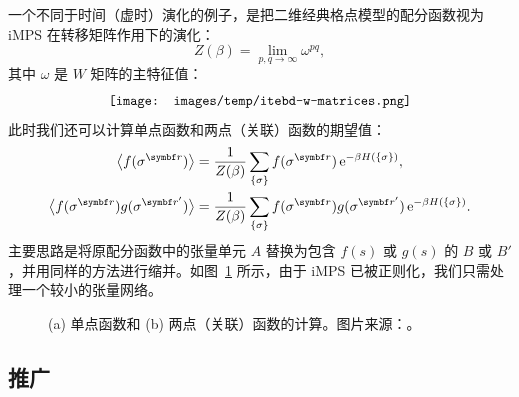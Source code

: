 一个不同于时间（虚时）演化的例子，是把二维经典格点模型的配分函数视为 iMPS 在转移矩阵作用下的演化：
\begin{equation}
  Z(\beta) = \lim_{p,q\to\infty} \omega^{pq},
\end{equation}
其中 $\omega$ 是 $W$ 矩阵的主特征值\cite{orus2008infinite}：
\begin{equation}
  \vcenter{\hbox{\texttt{[image: images/temp/itebd-w-matrices.png]}}}
\end{equation}
此时我们还可以计算单点函数和两点（关联）函数的期望值：
\begin{equation}
  \begin{aligned}
    \ev[\big]{f(\sigma^{\bm{r}})}
      &= \frac{1}{Z(\beta)} \sum_{\{\sigma\}} f(\sigma^{\bm{r}}) \, \ee^{-\beta H(\{\sigma\})}, \\
    \ev[\big]{f(\sigma^{\bm{r}}) g(\sigma^{\bm{r}'})}
      &= \frac{1}{Z(\beta)} \sum_{\{\sigma\}} f(\sigma^{\bm{r}}) g(\sigma^{\bm{r}'}) \, \ee^{-\beta H(\{\sigma\})}.
  \end{aligned}
\end{equation}
主要思路是将原配分函数中的张量单元 $A$ 替换为包含 $f(s)$ 或 $g(s)$ 的 $B$ 或 $B'$，并用同样的方法进行缩并。如图~\ref{fig:expectation-value} 所示，由于 iMPS 已被正则化，我们只需处理一个较小的张量网络。

\begin{figure}[htb]
  \centering
   \quad
  \caption[单点函数和两点关联函数的计算]{(a) 单点函数和 (b) 两点（关联）函数的计算。图片来源：\parencite{orus2008infinite}。}
  \label{fig:expectation-value}
\end{figure}

\subsection{推广}
\label{subsec:mps-generalization}

